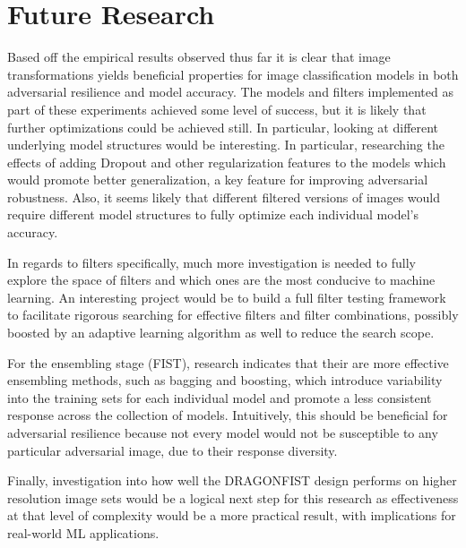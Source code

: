 \section{Future Research} \label{s:futureresearch}
Based off the empirical results observed thus far it is clear that image transformations yields beneficial properties for image classification models in both adversarial resilience and model accuracy.
The models and filters implemented as part of these experiments achieved some level of success, but it is likely that further optimizations could be achieved still.
In particular, looking at different underlying model structures would be interesting.
In particular, researching the effects of adding Dropout and other regularization features to the models which would promote better generalization, a key feature for improving adversarial robustness.
Also, it seems likely that different filtered versions of images would require different model structures to fully optimize each individual model's accuracy.

In regards to filters specifically, much more investigation is needed to fully explore the space of filters and which ones are the most conducive to machine learning.
An interesting project would be to build a full filter testing framework to facilitate rigorous searching for effective filters and filter combinations, possibly boosted by an adaptive learning algorithm as well to reduce the search scope.

For the ensembling stage (FIST), research indicates that their are more effective ensembling methods, such as bagging and boosting, which introduce variability into the training sets for each individual model and promote a less consistent response across the collection of models.
Intuitively, this should be beneficial for adversarial resilience because not every model would not be susceptible to any particular adversarial image, due to their response diversity.

Finally, investigation into how well the DRAGONFIST design performs on higher resolution image sets would be a logical next step for this research as effectiveness at that level of complexity would be a more practical result, with implications for real-world ML applications.